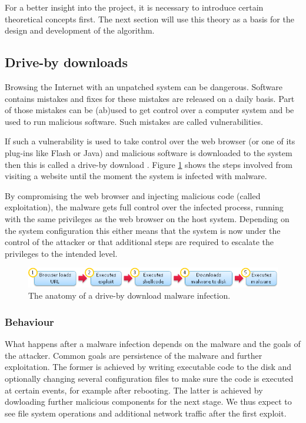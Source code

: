For a better insight into the project, it is necessary to introduce certain theoretical concepts first. The next section will use this theory as a basis for the design and development of the algorithm.

\subsection{Drive-by downloads}

Browsing the Internet with an unpatched system can be dangerous. Software contains mistakes and fixes for these mistakes are released on a daily basis. Part of those mistakes can be (ab)used to get control over a computer system and be used to run malicious software. Such mistakes are called vulnerabilities.

If such a vulnerability is used to take control over the web browser (or one of its plug-ins like Flash or Java) and malicious software is downloaded to the system then this is called a drive-by download \cite{Le2013}. Figure \ref{fig:dbdownload} shows the steps involved from visiting a website until the moment the system is infected with malware.

By compromising the web browser and injecting malicious code (called exploitation), the malware gets full control over the infected process, running with the same privileges as the web browser on the host system. Depending on the system configuration this either means that the system is now under the control of the attacker or that additional steps are required to escalate the privileges to the intended level.

\begin{figure}[h]
    \centering
    \includegraphics[width=12cm]{Images/drive-by-download.png}
    \caption{The anatomy of a drive-by download malware infection. \cite{dbdownload-anatomy}}
    \label{fig:dbdownload}
\end{figure}

\subsubsection{Behaviour}
\label{sec:behavior}

What happens after a malware infection depends on the malware and the goals of the attacker. Common goals are persistence of the malware and further exploitation. The former is achieved by writing executable code to the disk and optionally changing several configuration files to make sure the code is executed at certain events, for example after rebooting. The latter is achieved by dowloading further malicious components for the next stage. We thus expect to see file system operations and additional network traffic after the first exploit.

